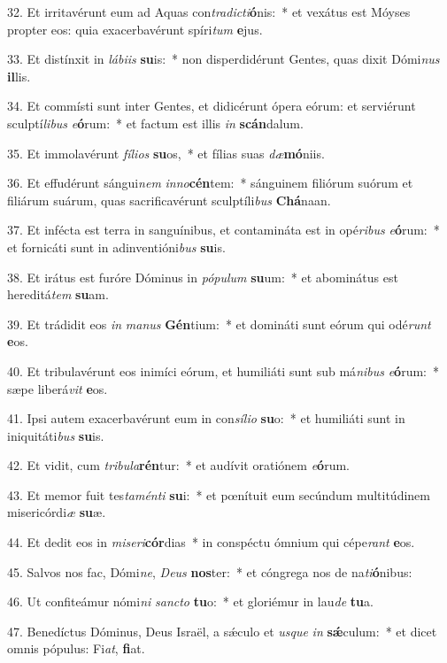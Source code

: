 32. Et irritavérunt eum ad Aquas con\textit{tra}\textit{dic}\textit{ti}\textbf{ó}nis:~*  et vexátus est Móyses propter eos: quia exacerbavérunt spíri\textit{tum} \textbf{e}jus.\

33. Et distínxit in \textit{lá}\textit{bi}\textit{is} \textbf{su}is:~*  non disperdidérunt Gentes, quas dixit Dómi\textit{nus} \textbf{il}lis.\

34. Et commísti sunt inter Gentes, et didicérunt ópera eórum: et serviérunt sculptí\textit{li}\textit{bus} \textit{e}\textbf{ó}rum:~*  et factum est illis \textit{in} \textbf{scán}dalum.\

35. Et immolavérunt \textit{fí}\textit{li}\textit{os} \textbf{su}os,~*  et fílias suas \textit{dæ}\textbf{mó}niis.\

36. Et effudérunt sángui\textit{nem} \textit{in}\textit{no}\textbf{cén}tem:~*  sánguinem filiórum suórum et filiárum suárum, quas sacrificavérunt sculptíli\textit{bus} \textbf{Chá}naan.\

37. Et infécta est terra in sanguínibus, et contamináta est in opé\textit{ri}\textit{bus} \textit{e}\textbf{ó}rum:~*  et fornicáti sunt in adinventióni\textit{bus} \textbf{su}is.\

38. Et irátus est furóre Dóminus in \textit{pó}\textit{pu}\textit{lum} \textbf{su}um:~*  et abominátus est hereditá\textit{tem} \textbf{su}am.\

39. Et trádidit eos \textit{in} \textit{ma}\textit{nus} \textbf{Gén}tium:~*  et domináti sunt eórum qui odé\textit{runt} \textbf{e}os.\

40. Et tribulavérunt eos inimíci eórum, et humiliáti sunt sub má\textit{ni}\textit{bus} \textit{e}\textbf{ó}rum:~*  sæpe liberá\textit{vit} \textbf{e}os.\

41. Ipsi autem exacerbavérunt eum in con\textit{sí}\textit{li}\textit{o} \textbf{su}o:~*  et humiliáti sunt in iniquitáti\textit{bus} \textbf{su}is.\

42. Et vidit, cum \textit{tri}\textit{bu}\textit{la}\textbf{rén}tur:~*  et audívit oratiónem \textit{e}\textbf{ó}rum.\

43. Et memor fuit tes\textit{ta}\textit{mén}\textit{ti} \textbf{su}i:~*  et pœnítuit eum secúndum multitúdinem misericórdi\textit{æ} \textbf{su}æ.\

44. Et dedit eos in \textit{mi}\textit{se}\textit{ri}\textbf{cór}dias~*  in conspéctu ómnium qui cépe\textit{rant} \textbf{e}os.\

45. Salvos nos fac, Dómi\textit{ne}, \textit{De}\textit{us} \textbf{nos}ter:~*  et cóngrega nos de na\textit{ti}\textbf{ó}nibus:\

46. Ut confiteámur nómi\textit{ni} \textit{sanc}\textit{to} \textbf{tu}o:~*  et gloriémur in lau\textit{de} \textbf{tu}a.\

47. Benedíctus Dóminus, Deus Israël, a sǽculo et \textit{us}\textit{que} \textit{in} \textbf{sǽ}culum:~*  et dicet omnis pópulus: Fi\textit{at}, \textbf{fi}at.\

